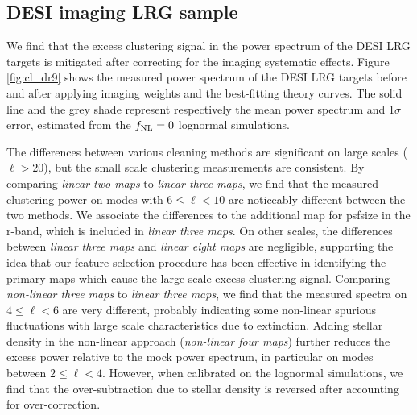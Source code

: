 \subsection{DESI imaging LRG sample}
We find that the excess clustering signal in the power spectrum of the DESI LRG targets is mitigated after correcting for the imaging systematic effects. Figure \ref{fig:cl_dr9} shows the measured power spectrum of the DESI LRG targets before and after applying imaging weights and the best-fitting theory curves. The solid line and the grey shade represent respectively the mean power spectrum and 1$\sigma$ error, estimated from the $f_{\rm NL}=0$ lognormal simulations. 



The differences between various cleaning methods are significant on large scales ($\ell > 20$), but the small scale clustering measurements are consistent. By comparing \textit{linear two maps} to \textit{linear three maps}, we find that the measured clustering power on modes with $6\leq \ell < 10$ are noticeably different between the two methods. We associate the differences to the additional map for psfsize in the r-band, which is included in \textit{linear three maps}. On other scales, the differences between \textit{linear three maps} and \textit{linear eight maps} are negligible, supporting the idea that our feature selection procedure has been effective in identifying the primary maps which cause the large-scale excess clustering signal. Comparing \textit{non-linear three maps} to \textit{linear three maps}, we find that the measured spectra on $4 \leq \ell < 6$ are very different, probably indicating some non-linear spurious fluctuations with large scale characteristics due to extinction. Adding stellar density in the non-linear approach (\textit{non-linear four maps}) further reduces the excess power relative to the mock power spectrum, in particular on modes between $2\leq \ell < 4$. However, when calibrated on the lognormal simulations, we find that the over-subtraction due to stellar density is reversed after accounting for over-correction.


